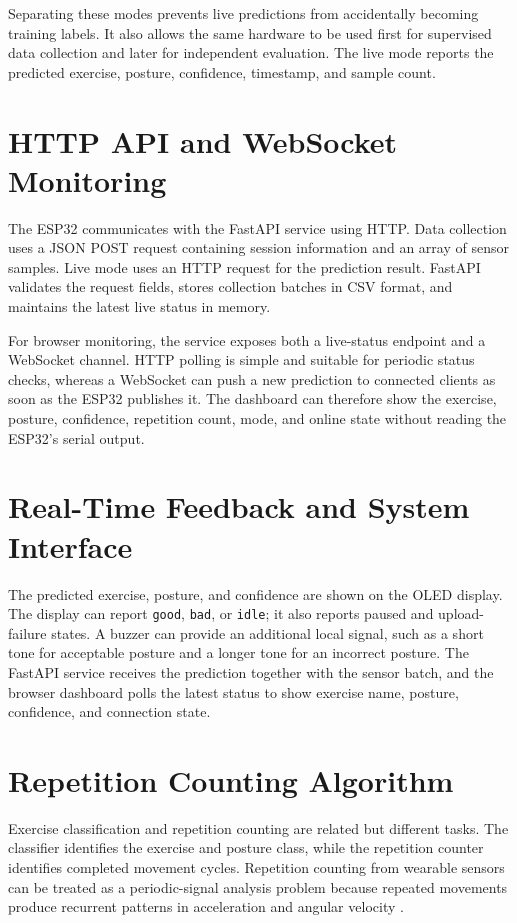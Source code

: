 Separating these modes prevents live predictions from accidentally becoming training
labels. It also allows the same hardware to be used first for supervised data
collection and later for independent evaluation. The live mode reports the predicted
exercise, posture, confidence, timestamp, and sample count.

\section{HTTP API and WebSocket Monitoring}
The ESP32 communicates with the FastAPI service using HTTP. Data collection uses a
JSON POST request containing session information and an array of sensor samples.
Live mode uses an HTTP request for the prediction result. FastAPI validates the
request fields, stores collection batches in CSV format, and maintains the latest
live status in memory.

For browser monitoring, the service exposes both a live-status endpoint and a
WebSocket channel. HTTP polling is simple and suitable for periodic status checks,
whereas a WebSocket can push a new prediction to connected clients as soon as the
ESP32 publishes it. The dashboard can therefore show the exercise, posture,
confidence, repetition count, mode, and online state without reading the ESP32's
serial output.

\section{Real-Time Feedback and System Interface}
The predicted exercise, posture, and confidence are shown on the OLED display. The
display can report \texttt{good}, \texttt{bad}, or \texttt{idle}; it also reports
paused and upload-failure states. A buzzer can provide an additional local signal,
such as a short tone for acceptable posture and a longer tone for an incorrect
posture. The FastAPI service receives the prediction together with the sensor batch,
and the browser dashboard polls the latest status to show exercise name, posture,
confidence, and connection state.

\section{Repetition Counting Algorithm}
Exercise classification and repetition counting are related but different tasks. The
classifier identifies the exercise and posture class, while the repetition counter
identifies completed movement cycles. Repetition counting from wearable sensors can
be treated as a periodic-signal analysis problem because repeated movements produce
recurrent patterns in acceleration and angular velocity
\cite{bao2004activity,ravi2005activity,oppenheim2010discrete}.

